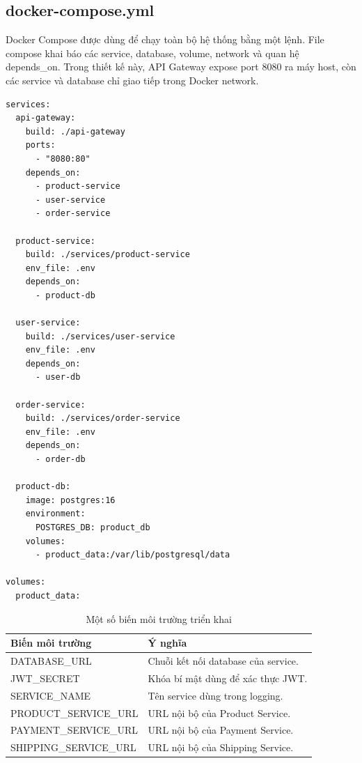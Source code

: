 \documentclass[../main.tex]{subfiles}
\begin{document}
\subsection{docker-compose.yml}
\label{subsection:4.6.2}

Docker Compose được dùng để chạy toàn bộ hệ thống bằng một lệnh. File compose khai báo các service, database, volume, network và quan hệ depends\_on. Trong thiết kế này, API Gateway expose port 8080 ra máy host, còn các service và database chỉ giao tiếp trong Docker network.

\begin{lstlisting}[caption={docker-compose.yml rút gọn cho hệ thống}, label={lst:chapter4-compose-full}]
services:
  api-gateway:
    build: ./api-gateway
    ports:
      - "8080:80"
    depends_on:
      - product-service
      - user-service
      - order-service

  product-service:
    build: ./services/product-service
    env_file: .env
    depends_on:
      - product-db

  user-service:
    build: ./services/user-service
    env_file: .env
    depends_on:
      - user-db

  order-service:
    build: ./services/order-service
    env_file: .env
    depends_on:
      - order-db

  product-db:
    image: postgres:16
    environment:
      POSTGRES_DB: product_db
    volumes:
      - product_data:/var/lib/postgresql/data

volumes:
  product_data:
\end{lstlisting}

\begin{table}[H]
    \centering
    \caption{Một số biến môi trường triển khai}
    \label{tab:chapter4-env-vars}
    \begin{tabular}{|p{}|p{}|}
        \hline
        \rowcolor{primary!35}
        \textbf{Biến môi trường} & \textbf{Ý nghĩa} \\
        \hline
        DATABASE\_URL & Chuỗi kết nối database của service. \\
        \hline
        JWT\_SECRET & Khóa bí mật dùng để xác thực JWT. \\
        \hline
        SERVICE\_NAME & Tên service dùng trong logging. \\
        \hline
        PRODUCT\_SERVICE\_URL & URL nội bộ của Product Service. \\
        \hline
        PAYMENT\_SERVICE\_URL & URL nội bộ của Payment Service. \\
        \hline
        SHIPPING\_SERVICE\_URL & URL nội bộ của Shipping Service. \\
        \hline
    \end{tabular}
\end{table}
\end{document}

